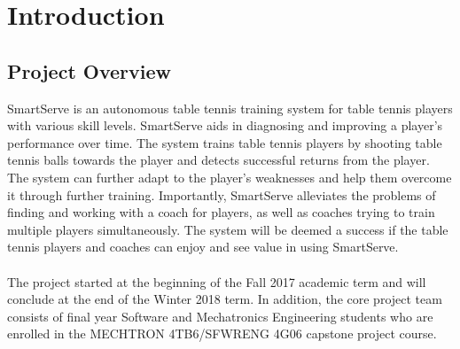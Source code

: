 \documentclass[11pt]{article}
\begin{document}

\section{Introduction}
\subsection{Project Overview}
SmartServe is an autonomous table tennis training system for table tennis players with various skill levels. SmartServe aids in diagnosing and improving a player's performance over time. The system trains table tennis players by shooting table tennis balls towards the player and detects successful returns from the player. The system can further adapt to the player's weaknesses and help them overcome it through further training. Importantly, SmartServe alleviates the problems of finding and working with a coach for players, as well as coaches trying to train multiple players simultaneously. The system will be deemed a success if the table tennis players and coaches can enjoy and see value in using SmartServe.\\\\
The project started at the beginning of the Fall 2017 academic term and will conclude at the end of the Winter 2018 term. In addition, the core project team consists of final year Software and Mechatronics Engineering students who are enrolled in the MECHTRON 4TB6/SFWRENG 4G06 capstone project course.
\end{document}
